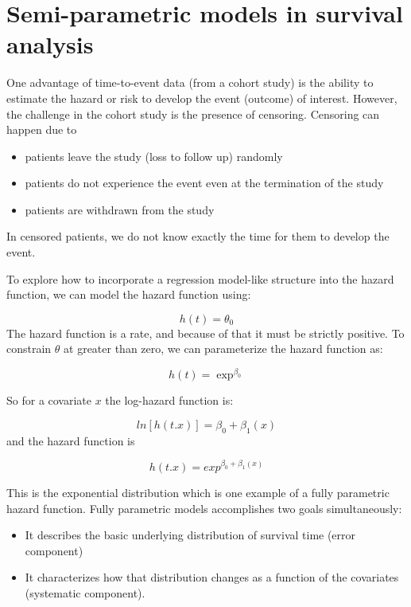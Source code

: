 \documentclass[
  10pt,
]{krantz}
\providecommand{\tightlist}{%
  \setlength{\itemsep}{0pt}\setlength{\parskip}{0pt}}
\begin{document}
\hypertarget{semi-parametric-models-in-survival-analysis}{%
\section{\texorpdfstring{Semi-parametric models in survival analysis}{Semi-parametric models in survival analysis}}\label{semi-parametric-models-in-survival-analysis}}

One advantage of time-to-event data (from a cohort study) is the ability to estimate the hazard or risk to develop the event (outcome) of interest. However, the challenge in the cohort study is the presence of censoring. Censoring can happen due to

\begin{itemize}
\tightlist
\item
  patients leave the study (loss to follow up) randomly
\item
  patients do not experience the event even at the termination of the study
\item
  patients are withdrawn from the study
\end{itemize}

In censored patients, we do not know exactly the time for them to develop the event.

To explore how to incorporate a regression model-like structure into the hazard function, we can model the hazard function using:

\[h(t) = \theta_0\]
The hazard function is a rate, and because of that it must be strictly positive. To constrain \(\theta\) at greater than zero, we can parameterize the hazard function as:

\[h(t) = \exp^{\beta_0}\]

So for a covariate \(x\) the log-hazard function is:

\[ln[h(t.x)] = \beta_0 + \beta_1(x)\]
and the hazard function is

\[h(t.x) = exp^{\beta_0 + \beta_1(x)}\]

This is the exponential distribution which is one example of a fully parametric hazard function. Fully parametric models accomplishes two goals simultaneously:

\begin{itemize}
\tightlist
\item
  It describes the basic underlying distribution of survival time (error component)
\item
  It characterizes how that distribution changes as a function of the covariates (systematic component).
\end{itemize}
\end{document}
